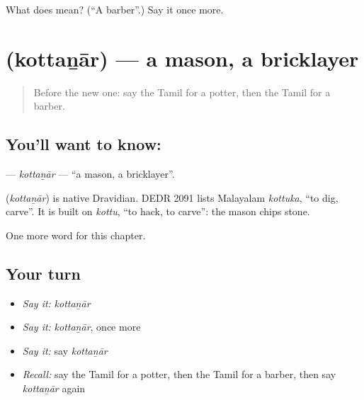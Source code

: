 \begin{tcolorbox}[breakable,colback=teal!4,colframe=teal!35!black,title={Before you move on}]
What does  mean? (\textquotedblleft{}A barber\textquotedblright{}.) Say it once more.
\end{tcolorbox}
\section[\texorpdfstring{\ta{கொத்தனார்} (kottaṉār)}{கொத்தனார் (kottaṉār)}]{ (kottaṉār) — a mason, a bricklayer}

\label{lesson:TA-C224-kottanar}



\begin{quote}
Before the new one: say the Tamil for a potter, then the Tamil for a barber.
\end{quote}

\subsection*{You'll want to know: }
\textbf{} — \emph{kottaṉār} — \textquotedblleft{}a mason, a bricklayer\textquotedblright{}.

\begin{cousinweb}
\textbf{} (\emph{kottaṉār}) is native Dravidian. DEDR 2091 lists Malayalam \emph{kottuka}, \textquotedblleft{}to dig, carve\textquotedblright{}. It is built on \emph{kottu}, \textquotedblleft{}to hack, to carve\textquotedblright{}: the mason chips stone.
\end{cousinweb}

\begin{grammarlens}[title={What you've built}]
One more word for this chapter.
\end{grammarlens}

\subsection*{Your turn}
\begin{itemize}
\raggedright
  \item \emph{Say it:} \emph{kottaṉār}
  \item \emph{Say it:} \emph{kottaṉār}, once more
  \item \emph{Say it:} say \emph{kottaṉār}
  \item \emph{Recall:} say the Tamil for a potter, then the Tamil for a barber, then say \emph{kottaṉār} again
\end{itemize}

